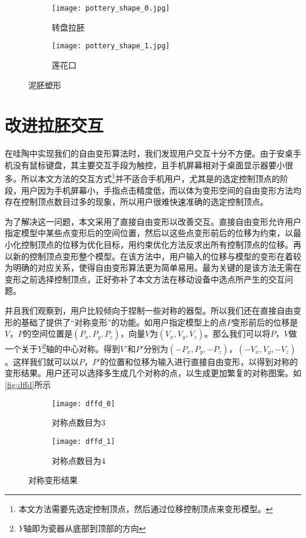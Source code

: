 \begin{figure}[htbp]
	\centering
	\begin{subfigure}[b]{.4\textwidth}
		\centering
		\texttt{[image: pottery\_shape\_0.jpg]}
		\caption{转盘拉胚}\label{subfig:pottery_shape_0}
	\end{subfigure}
	\begin{subfigure}[b]{.4\textwidth}
		\centering
		\texttt{[image: pottery\_shape\_1.jpg]}
		\caption{莲花口}\label{subfig:pottery_shape_1}
	\end{subfigure}
	\caption{泥胚塑形}\label{fig:pottery_shape}
\end{figure}

\section{改进拉胚交互}
在哇陶中实现我们的自由变形算法时，我们发现用户交互十分不方便。由于安桌手机没有鼠标键盘，其主要交互手段为触控，且手机屏幕相对于桌面显示器要小很多。所以本文方法的交互方式\footnote{本文方法需要先选定控制顶点，然后通过位移控制顶点来变形模型。}并不适合手机用户，尤其是的选定控制顶点的阶段，用户因为手机屏幕小，手指点击精度低，而以体为变形空间的自由变形方法均存在控制顶点数目过多的现象，所以用户很难快速准确的选定控制顶点。

为了解决这一问题，本文采用了直接自由变形\cite{hsu1992}以改善交互。直接自由变形允许用户指定模型中某些点变形后的空间位置，然后以这些点变形前后的位移为约束，以最小化控制顶点的位移为优化目标，用约束优化方法反求出所有控制顶点的位移。再以新的控制顶点变形整个模型。在该方法中，用户输入的位移与模型的变形在着较为明确的对应关系，使得自由变形算法更为简单易用。最为关键的是该方法无需在变形之前选择控制顶点，正好弥补了本文方法在移动设备中选点所产生的交互问题。

并且我们观察到，用户比较倾向于捏制一些对称的器型。所以我们还在直接自由变形的基础了提供了“对称变形”的功能。如用户指定模型上的点$P$变形前后的位移是$V$，$P$的空间位置是$(P_x, P_y, P_z)$，向量$V$为$(V_x, V_y, V_z)$。那么我们可以将$P$，$V$做一个关于$Y$\footnote{$Y$轴即为瓷器从底部到顶部的方向}轴的中心对称。得到$V'$和$P'$分别为$(-P_x, P_y, -P_z)$，$(-V_x, V_y, -V_z)$。这样我们就可以以$P$，$P'$的位置和位移为输入进行直接自由变形，以得到对称的变形结果。用户还可以选择多生成几个对称的点，以生成更加繁复的对称图案。如\autoref{fig:dffd}所示

\begin{figure}[htbp]
	\centering
	\begin{subfigure}[b]{.4\textwidth}
		\centering
		\texttt{[image: dffd\_0]}
		\caption{对称点数目为3}\label{subfig:dffd_0}
	\end{subfigure}
	\begin{subfigure}[b]{.4\textwidth}
		\centering
		\texttt{[image: dffd\_1]}
		\caption{对称点数目为4}\label{subfig:dffd_1}
	\end{subfigure}
	\caption{对称变形结果}\label{fig:dffd}
\end{figure}

